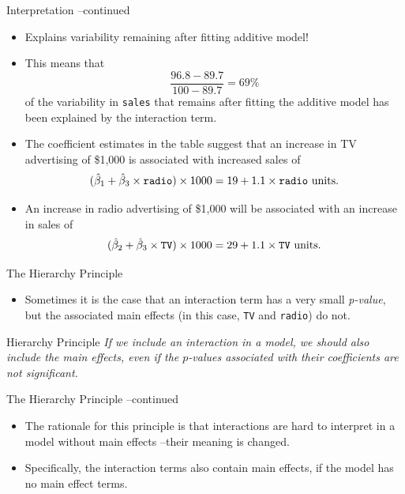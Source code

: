 \documentclass[aspectratio=169, 11pt]{beamer}
\begin{document}
\begin{frame}{Interpretation --continued}
  \begin{itemize}
    \item Explains variability remaining after fitting additive model!

    \item This means that
      $$\frac{96.8 - 89.7}{100 - 89.7}=69\%$$
    of the variability in \texttt{sales} that remains after fitting the additive model has been explained by the interaction term.

    \item The coefficient estimates in the table suggest that an increase in TV advertising of \$1,000 is associated with increased sales of
      $$ (\hat{\beta}_1 + \hat{\beta}_3 \times \text{\texttt{radio}}) \times 1000 = 19 + 1.1 \times \text{\texttt{radio} units.} $$

    \item An increase in radio advertising of \$1,000 will be associated with an increase in sales of
      $$ (\hat{\beta}_2 + \hat{\beta}_3 \times \text{\texttt{TV}}) \times 1000 = 29 + 1.1 \times \text{\texttt{TV} units.} $$
  \end{itemize}
\end{frame}

\begin{frame}{The Hierarchy Principle}
  \begin{itemize}
    \item Sometimes it is the case that an interaction term has a very small \textit{p-value}, but the associated main effects (in this case, \texttt{TV} and \texttt{radio}) do not.
  \end{itemize}

  \begin{block}{Hierarchy Principle}
    \textit{If we include an interaction in a model, we should also include the main effects, even if the $p$-values associated with their coefficients are not significant.}
  \end{block}
\end{frame}

\begin{frame}{The Hierarchy Principle --continued}
  \begin{itemize}
    \item The rationale for this principle is that interactions are hard to interpret in a model without main effects --their meaning is changed.

    \item Specifically, the interaction terms also contain main effects, if the model has no main effect terms.
  \end{itemize}
\end{frame}
\end{document}
